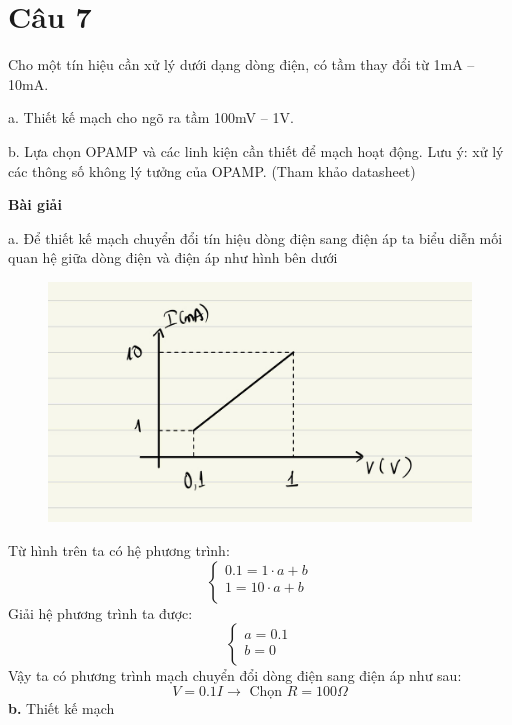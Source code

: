\section{Câu 7}
Cho một tín hiệu cần xử lý dưới dạng dòng điện, có tầm thay đổi từ 1mA – 10mA.

a. Thiết kế mạch cho ngõ ra tầm 100mV – 1V.

b. Lựa chọn OPAMP và các linh kiện cần thiết để mạch hoạt động. Lưu ý: xử lý các
thông số không lý tưởng của OPAMP. (Tham khảo datasheet)    

\begin{center}
\textbf{Bài giải}
\end{center}

a. Để thiết kế mạch chuyển đổi tín hiệu dòng điện sang điện áp ta biểu diễn mối quan hệ giữa dòng điện và điện áp như hình bên dưới
\begin{figure}[H]
    \centering
    \includegraphics[scale=0.2]{image/C7_chart.jpg} 
\end{figure}
Từ hình trên ta có hệ phương trình:
\begin{equation*}
    \begin{cases}
        0.1 = 1\cdot a + b  \\
        1 = 10\cdot a + b\\
    \end{cases}
\end{equation*}
Giải hệ phương trình ta được:  
\begin{equation*}
    \begin{cases}
        a = 0.1\\
        b = 0 \\
    \end{cases}
\end{equation*}
Vậy ta có phương trình mạch chuyển đổi dòng điện sang điện áp như sau:
\begin{equation*}
    \boxed{V = 0.1I}
    \rightarrow \text{ Chọn } R = 100\Omega
\end{equation*}
\textbf{b.} Thiết kế mạch


